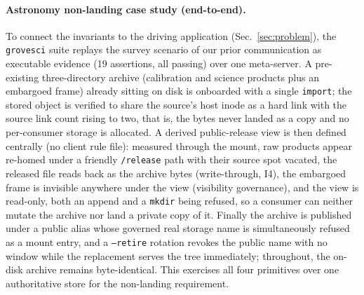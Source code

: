 \documentclass[numberedsection,acmtos]{acmart}
\begin{document}
\paragraph{Astronomy non-landing case study (end-to-end).}
To connect the invariants to the driving application (Sec.~\ref{sec:problem}),
the \texttt{grovesci} suite replays the survey scenario of our prior
communication \citep{han2026yourfs} as executable evidence (19 assertions, all
passing) over one meta-server. A pre-existing three-directory archive
(calibration and science products plus an embargoed frame) already sitting on
disk is onboarded with a single \texttt{import}; the stored object is verified
to share the source's host inode as a hard link with the source link count
rising to two, that is, the bytes never landed as a copy and no per-consumer
storage is allocated. A derived public-release view is then defined centrally (no
client rule file): measured through the mount, raw products appear re-homed
under a friendly \texttt{/release} path with their source spot vacated, the
released file reads back as the archive bytes (write-through, I4), the embargoed
frame is invisible anywhere under the view (visibility governance), and the view
is read-only, both an append and a \texttt{mkdir} being refused, so a consumer
can neither mutate the archive nor land a private copy of it. Finally the
archive is published under a public alias whose governed real storage name is
simultaneously refused as a mount entry, and a \texttt{--retire} rotation
revokes the public name with no window while the replacement serves the tree
immediately; throughout, the on-disk archive remains byte-identical. This
exercises all four primitives over one authoritative store for the non-landing
requirement.
\end{document}
